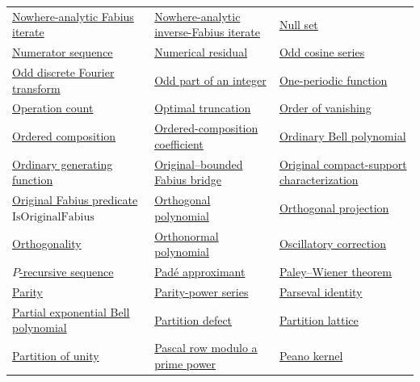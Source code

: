 \documentclass[11pt,oneside]{article}
\begin{document}
\begin{longtable}{L{0.31\textwidth}L{0.31\textwidth}L{0.31\textwidth}}
\hyperlink{gls:nowhere-analytic-fabius-iterate}{Nowhere-analytic Fabius iterate} & \hyperlink{gls:nowhere-analytic-inverse-iterate}{Nowhere-analytic inverse-Fabius iterate} & \hyperlink{gls:null-set}{Null set} \\
\hyperlink{gls:numerator-sequence}{Numerator sequence} & \hyperlink{gls:numerical-residual}{Numerical residual} & \hyperlink{gls:odd-cosine-series}{Odd cosine series} \\
\hyperlink{gls:odd-discrete-fourier-transform}{Odd discrete Fourier transform} & \hyperlink{gls:odd-part-of-an-integer}{Odd part of an integer} & \hyperlink{gls:one-periodic-function}{One-periodic function} \\
\hyperlink{gls:operation-count}{Operation count} & \hyperlink{gls:optimal-truncation}{Optimal truncation} & \hyperlink{gls:order-of-vanishing}{Order of vanishing} \\
\hyperlink{gls:ordered-composition}{Ordered composition} & \hyperlink{gls:ordered-composition-coefficient}{Ordered-composition coefficient} & \hyperlink{gls:ordinary-bell-polynomial}{Ordinary Bell polynomial} \\
\hyperlink{gls:ordinary-generating-function}{Ordinary generating function} & \hyperlink{gls:original-bounded-bridge}{Original--bounded Fabius bridge} & \hyperlink{gls:original-fabius-characterization}{Original compact-support characterization} \\
\hyperlink{gls:is-original-fabius}{Original Fabius predicate \(\mathrm{IsOriginalFabius}\)} & \hyperlink{gls:orthogonal-polynomial}{Orthogonal polynomial} & \hyperlink{gls:orthogonal-projection}{Orthogonal projection} \\
\hyperlink{gls:orthogonality}{Orthogonality} & \hyperlink{gls:orthonormal-polynomial}{Orthonormal polynomial} & \hyperlink{gls:oscillatory-correction}{Oscillatory correction} \\
\hyperlink{gls:p-recursive-sequence}{\(P\)-recursive sequence} & \hyperlink{gls:pade-approximant}{Padé approximant} & \hyperlink{gls:paley-wiener-theorem}{Paley--Wiener theorem} \\
\hyperlink{gls:parity}{Parity} & \hyperlink{gls:parity-power-series}{Parity-power series} & \hyperlink{gls:parseval-identity}{Parseval identity} \\
\hyperlink{gls:partial-exponential-bell-polynomial}{Partial exponential Bell polynomial} & \hyperlink{gls:partition-defect}{Partition defect} & \hyperlink{gls:partition-lattice}{Partition lattice} \\
\hyperlink{gls:partition-of-unity}{Partition of unity} & \hyperlink{gls:prime-power-pascal-row}{Pascal row modulo a prime power} & \hyperlink{gls:peano-kernel}{Peano kernel} \\

\end{longtable}
\end{document}

